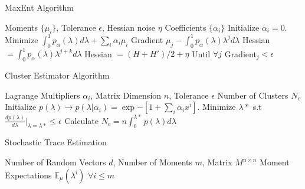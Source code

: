 \documentclass[letterpaper]{article} %
\begin{document}
\begin{algorithm}[tb]
	\caption{MaxEnt Algorithm}
	\label{alg:maxent}
	
	\begin{algorithmic}[1]
		 Moments $\{\mu_{i}\}$, Tolerance $\epsilon$, Hessian noise $\eta$
		 Coefficients $\{\alpha_{i}\}$
		\STATE Initialize $\alpha_{i} = 0$.
		\STATE Minimize $\int_{0}^{1}p_{\alpha}(\lambda)d\lambda + \sum_{i}\alpha_{i}\mu_{i}$
		\STATE Gradient $\mu_{j}-\int_{0}^{1}p_{\alpha}(\lambda)\lambda^{j}d\lambda$
		\STATE Hessian  $ = \int_{0}^{1}p_{\alpha}(\lambda)\lambda^{j+k}d\lambda$
		\STATE Hessian $= (H+H')/2 + \eta$
		\STATE Until $\forall j$ Gradient$_{j} < \epsilon$		
	\end{algorithmic}
\end{algorithm}
\begin{algorithm}[tb]
	\caption{Cluster Estimator Algorithm}
	\label{alg:clusteralg}
	
	\begin{algorithmic}[1]
		 Lagrange Multipliers ${\alpha_{i}}$, Matrix Dimension $n$, Tolerance $\epsilon$
		 Number of Clusters $N_{c}$
		\STATE Initialize $p(\lambda) \rightarrow p(\lambda|\alpha_{i}) = \exp{-[1+\sum_{i}\alpha_{i}x^{i}]}$.
		\STATE Minimize $\lambda*$ s.t $\frac{dp(\lambda)}{d\lambda}|_{\lambda=\lambda*} \leq \epsilon$
		\STATE Calculate $N_{c} = n\int_{0}^{\lambda*} p(\lambda)d\lambda$	
	\end{algorithmic}
\end{algorithm}

\begin{algorithm}[tb]
	\caption{Stochastic Trace Estimation}
	\label{alg:stochtrace}
	
	\begin{algorithmic}[1]
		 Number of Random Vectors $d$, Number of Moments $m$, Matrix $M^{n\times n}$
		 Moment Expectations $\mathbb{E}_{\mu}(\lambda^{i})$ $\forall i\leq m$
	   
		   
		 \ENDFOR
	 \ENDFOR
	\end{algorithmic}
\end{algorithm}
\end{document}
